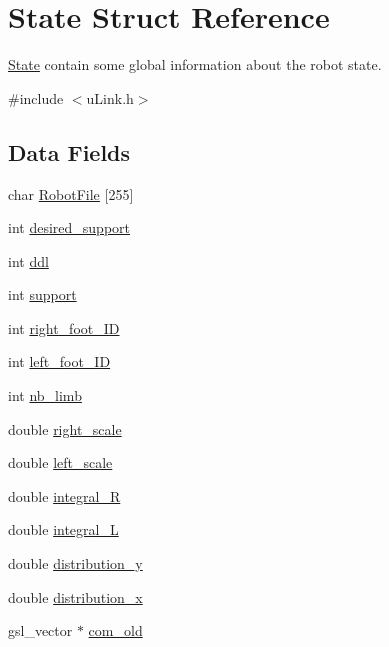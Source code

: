 \hypertarget{struct_state}{\section{State Struct Reference}
\label{struct_state}
}


\hyperlink{struct_state}{State} contain some global information about the robot state.  




{\ttfamily \#include $<$u\-Link.\-h$>$}

\subsection*{Data Fields}
\begin{DoxyCompactItemize}
\item 
char \hyperlink{struct_state_a56f05fd9f431f5460c0cd19f7b6113d5}{Robot\-File} \mbox{[}255\mbox{]}
\item 
int \hyperlink{struct_state_a8067647d8a7eea1d16f30f80cea4dec4}{desired\-\_\-support}
\item 
int \hyperlink{struct_state_a6e1faaa1458e3828ba45cde20902bb6d}{ddl}
\item 
int \hyperlink{struct_state_ae8470b9dfef111e0d72a983ce72e4c9c}{support}
\item 
int \hyperlink{struct_state_a412b58628ab2f6728a48e833b58afa71}{right\-\_\-foot\-\_\-\-I\-D}
\item 
int \hyperlink{struct_state_a4083f916ed4e5eb445d0fcd498bc6d61}{left\-\_\-foot\-\_\-\-I\-D}
\item 
int \hyperlink{struct_state_ad91000ed96d0c4f360d6ec95cf41803f}{nb\-\_\-limb}
\item 
double \hyperlink{struct_state_a14b89c1ada80dbb1e2318987479bcccb}{right\-\_\-scale}
\item 
double \hyperlink{struct_state_ac2972677a49eea464b96c7dfec5badac}{left\-\_\-scale}
\item 
double \hyperlink{struct_state_a76a6b73b7f13cc4ef20a22f8b4dd17c3}{integral\-\_\-\-R}
\item 
double \hyperlink{struct_state_a44f97c1460cb92c4aedb1cb49e34c0f7}{integral\-\_\-\-L}
\item 
double \hyperlink{struct_state_a3027c945c3ccd5eef8ef7cc5a730c231}{distribution\-\_\-y}
\item 
double \hyperlink{struct_state_a0991a52aa3fa76765202f861a97aca77}{distribution\-\_\-x}
\item 
gsl\-\_\-vector $\ast$ \hyperlink{struct_state_a537e2512e9aca2c9b68c41054ad52fa8}{com\-\_\-old}

\end{DoxyCompactItemize}
